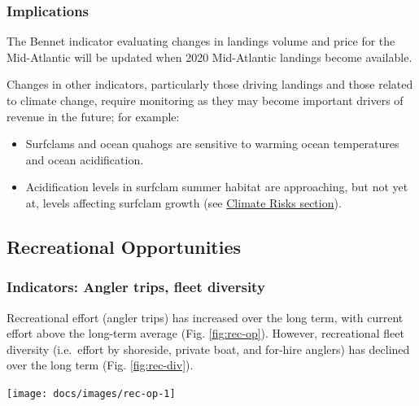 \documentclass[
  10pt,
]{article}
\providecommand{\tightlist}{%
  \setlength{\itemsep}{0pt}\setlength{\parskip}{0pt}}
\let\origfigure\figure
\let\endorigfigure\endfigure
\renewenvironment{figure}[1][2] {
    \expandafter\origfigure\expandafter[H]
} {
    \endorigfigure
}
\begin{document}
\hypertarget{implications-1}{%
\subsubsection{Implications}\label{implications-1}}

The Bennet indicator evaluating changes in landings volume and price for
the Mid-Atlantic will be updated when 2020 Mid-Atlantic landings become
available.

Changes in other indicators, particularly those driving landings and
those related to climate change, require monitoring as they may become
important drivers of revenue in the future; for example:

\begin{itemize}
\tightlist
\item
  Surfclams and ocean quahogs are sensitive to warming ocean
  temperatures and ocean acidification.\\
\item
  Acidification levels in surfclam summer habitat are approaching, but
  not yet at, levels affecting surfclam growth (see
  \protect\hyperlink{climate-and-ecosystem-productivity}{Climate Risks
  section}).
\end{itemize}

\hypertarget{recreational-opportunities}{%
\subsection{Recreational
Opportunities}\label{recreational-opportunities}}

\hypertarget{indicators-angler-trips-fleet-diversity}{%
\subsubsection{Indicators: Angler trips, fleet
diversity}\label{indicators-angler-trips-fleet-diversity}}

Recreational effort (angler trips) has increased over the long term,
with current effort above the long-term average (Fig. \ref{fig:rec-op}).
However, recreational fleet diversity (i.e.~effort by shoreside, private
boat, and for-hire anglers) has declined over the long term (Fig.
\ref{fig:rec-div}).

\begin{figure}

{\centering \texttt{[image: docs/images/rec-op-1]} 

}

\caption{Recreational effort in the Mid-Atlantic.}\label{fig:rec-op}
\end{figure}
\end{document}
